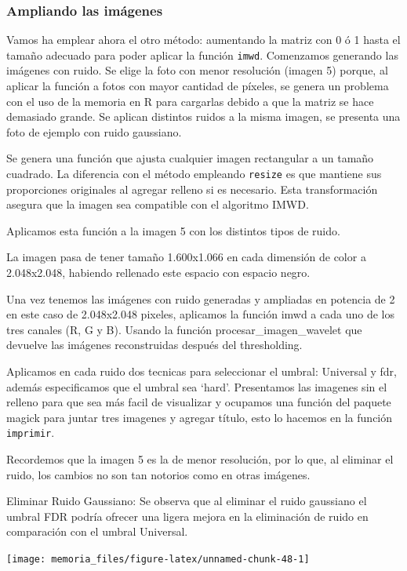 \documentclass[
]{article}
\begin{document}
\subsubsection{Ampliando las imágenes}\label{ampliando-las-imuxe1genes}

Vamos ha emplear ahora el otro método: aumentando la matriz con 0 ó 1
hasta el tamaño adecuado para poder aplicar la función \texttt{imwd}.
Comenzamos generando las imágenes con ruido. Se elige la foto con menor
resolución (imagen 5) porque, al aplicar la función a fotos con mayor
cantidad de píxeles, se genera un problema con el uso de la memoria en R
para cargarlas debido a que la matriz se hace demasiado grande. Se
aplican distintos ruidos a la misma imagen, se presenta una foto de
ejemplo con ruido gaussiano.

Se genera una función que ajusta cualquier imagen rectangular a un
tamaño cuadrado. La diferencia con el método empleando \texttt{resize}
es que mantiene sus proporciones originales al agregar relleno si es
necesario. Esta transformación asegura que la imagen sea compatible con
el algoritmo IMWD.

Aplicamos esta función a la imagen 5 con los distintos tipos de ruido.

La imagen pasa de tener tamaño 1.600x1.066 en cada dimensión de color a
2.048x2.048, habiendo rellenado este espacio con espacio negro.

Una vez tenemos las imágenes con ruido generadas y ampliadas en potencia
de 2 en este caso de 2.048x2.048 pixeles, aplicamos la función imwd a
cada uno de los tres canales (R, G y B). Usando la función
procesar\_imagen\_wavelet que devuelve las imágenes reconstruidas
después del thresholding.

Aplicamos en cada ruido dos tecnicas para seleccionar el umbral:
Universal y fdr, además especificamos que el umbral sea `hard'.
Presentamos las imagenes sin el relleno para que sea más facil de
visualizar y ocupamos una función del paquete magick para juntar tres
imagenes y agregar título, esto lo hacemos en la función
\texttt{imprimir}.

Recordemos que la imagen 5 es la de menor resolución, por lo que, al
eliminar el ruido, los cambios no son tan notorios como en otras
imágenes.

Eliminar Ruido Gaussiano: Se observa que al eliminar el ruido gaussiano
el umbral FDR podría ofrecer una ligera mejora en la eliminación de
ruido en comparación con el umbral Universal.

\begin{center}\texttt{[image: memoria\_files/figure-latex/unnamed-chunk-48-1]} \end{center}
\end{document}
